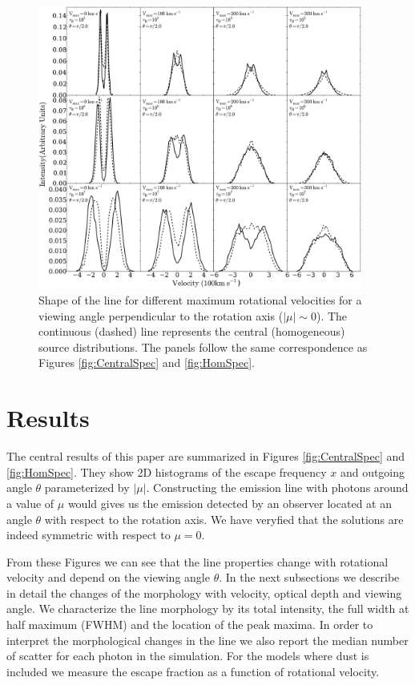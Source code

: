 \documentclass{emulateapj}
\newcommand{\ly}{{\ifmmode{{\rm Ly}\alpha~}\else{Ly$\alpha$~}\fi}}
\begin{document}
\begin{figure}
\begin{center}
  \includegraphics[width=0.95\textwidth]{f4.pdf}
\end{center}
\caption{Shape of the \ly line for different maximum rotational
  velocities for a viewing angle perpendicular to the rotation axis
  ($|\mu|\sim 0$). The continuous (dashed) line represents the central
  (homogeneous) source distributions.  The panels follow the same
  correspondence as Figures \ref{fig:CentralSpec} and \ref{fig:HomSpec}.
    \label{fig:differentvelocities}}  
\end{figure}


\section{Results}
\label{sec:results}

The central results of this paper are summarized in Figures
\ref{fig:CentralSpec} and \ref{fig:HomSpec}. They show 2D histograms
of the escape frequency $x$ and outgoing angle $\theta$ parameterized by
$|\mu|$. Constructing the emission line with photons around a value
of $\mu$ would gives us the emission detected by an observer located at an
angle $\theta$ with respect to the rotation axis. We have veryfied
that the solutions are indeed symmetric with respect to $\mu=0$.  

From these Figures we can see that the line properties change with
rotational velocity and depend on the viewing angle $\theta$.  In the
next subsections we describe in  detail the changes of the morphology
with velocity, optical depth and viewing angle. We characterize the
line morphology by its total intensity, the full width at half maximum
(FWHM) and the location of the peak maxima. In order to interpret the
morphological changes in the line we also report the median number of
scatter for each \ly photon in the simulation. For the models where
dust is included we measure the escape fraction as a function of
rotational velocity.  
\end{document}
